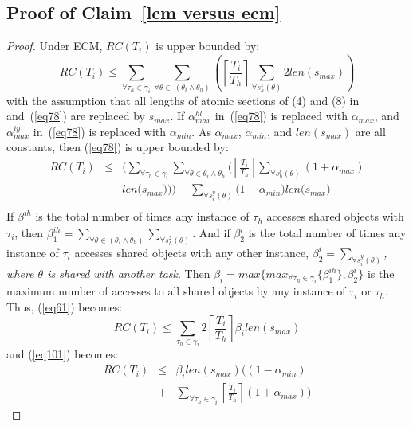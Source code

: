 \documentclass[conference]{sig-alternate}
\begin{document}
\subsection{\label{proof_lcm versus ecm}Proof of Claim~\ref{lcm versus ecm}}
\begin{proof}
Under ECM, $RC(T_{i})$ is upper bounded by:
\begin{equation}
RC(T_{i})\le\sum_{\forall \tau_{h}\in\gamma_{i}}\sum_{\forall \theta\in\ (\theta_{i}\wedge\theta_{h})}\left(\left\lceil\frac{T_{i}}{T_{h}}\right\rceil\sum_{\forall s_{h}^{z}(\theta)}2len(s_{max})\right)\label{eq61}\end{equation}
with the assumption that all lengths of atomic sections of (4) and (8) in~\cite{stmconcurrencycontrol:emsoft11} and~(\ref{eq78}) are replaced by $s_{max}$.
If $\alpha_{max}^{hl}$ in~(\ref{eq78}) is replaced with $\alpha_{max}$, and $\alpha_{max}^{iy}$ in~(\ref{eq78}) is replaced with $\alpha_{min}$. As $\alpha_{max}$, $\alpha_{min}$, and $len(s_{max})$ are all constants, then (\ref{eq78}) is upper bounded by:
\begin{eqnarray}
RC(T_i) & \le & \Bigg(\sum_{\forall \tau_h \in \gamma_i}\sum_{\forall\theta \in \theta_i \wedge \theta_h}\Bigg(\left\lceil\frac{T_{i}}{T_{h}}\right\rceil\sum_{\forall s_{h}^{l}(\theta)}\left(1+\alpha_{max}\right)\nonumber\\
& & len\Big(s_{max}\Big)\Bigg)\Bigg)
 +  \sum_{\forall s_{i}^{y}(\theta)}\Big(1-\alpha_{min}\Big)len\Big(s_{max}\Big)\nonumber\\ 
\label{eq101}\end{eqnarray}
%
If $\beta_1^{ih}$ is the total number of times any instance of $\tau_h$ accesses shared objects with $\tau_i$, then $\beta_1^{ih}=\sum_{\forall \theta\in(\theta_{i}\wedge\theta_{h})}\sum_{\forall s_{h}^{z}(\theta)}$. And if $\beta_2^i$ is the total number of times any instance of $\tau_i$ accesses shared objects with any other instance,   $\beta_2^i=\sum_{\forall s_{i}^{y}(\theta)}$\textit{, where $\theta$ is shared with another task}. Then $\beta_{i}=max\{max_{\forall \tau_h \in \gamma_i}\{\beta_1^{ih}\},\beta_2^i\}$ is the maximum number of accesses to all shared objects by any instance of $\tau_{i}$ or $\tau_{h}$. 
Thus, (\ref{eq61}) becomes:
\begin{equation}
RC(T_{i})\le\sum_{\tau_{h}\in\gamma_{i}}2\left\lceil\frac{T_{i}}{T_{h}}\right\rceil\beta_{i}len(s_{max})
\label{eq63}\end{equation}
and (\ref{eq101}) becomes:
\begin{eqnarray}
RC(T_{i}) & \le & \beta_{i}len(s_{max}) \Bigg((1-\alpha_{min})\nonumber\\
& + & \sum_{\forall \tau_h \in \gamma_i}\left\lceil\frac{T_{i}}{T_{h}}\right\rceil(1+\alpha_{max})\Bigg)
\label{eq102}\end{eqnarray}


\end{proof}
\end{document}
